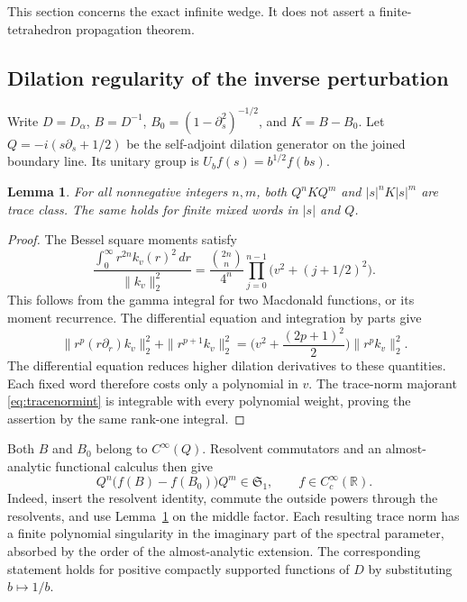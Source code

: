 \documentclass[11pt]{amsart}
\numberwithin{equation}{section}
\newtheorem{lemma}[theorem]{Lemma}
\theoremstyle{remark}
\newcommand{\R}{\mathbb{R}}
\newcommand{\Sone}{\mathfrak{S}_1}
\begin{document}
This section concerns the exact infinite wedge. It does not assert a finite-tetrahedron propagation theorem.

\subsection{Dilation regularity of the inverse perturbation}
Write $D=D_\alpha$, $B=D^{-1}$, $B_0=(1-\partial_s^2)^{-1/2}$, and $K=B-B_0$. Let $Q=-i(s\partial_s+1/2)$ be the self-adjoint dilation generator on the joined boundary line. Its unitary group is $U_bf(s)=b^{1/2}f(bs)$.

\begin{lemma}\label{lem:dilation}
For all nonnegative integers $n,m$, both $Q^nKQ^m$ and $|s|^nK|s|^m$ are trace class. The same holds for finite mixed words in $|s|$ and $Q$.
\end{lemma}

\begin{proof}
The Bessel square moments satisfy
\begin{equation}\label{eq:besselmoments}
\frac{\int_0^\infty r^{2n}k_v(r)^2\,dr}{\|k_v\|_2^2}=\frac{\binom{2n}{n}}{4^n}\prod_{j=0}^{n-1}\big(v^2+(j+1/2)^2\big) .
\end{equation}
This follows from the gamma integral for two Macdonald functions, or its moment recurrence. The differential equation and integration by parts give
\begin{equation}\label{eq:besselibp}
\|r^p(r\partial_r)k_v\|_2^2+\|r^{p+1}k_v\|_2^2=\Big(v^2+\frac{(2p+1)^2}{2}\Big)\|r^pk_v\|_2^2 .
\end{equation}
The differential equation reduces higher dilation derivatives to these quantities. Each fixed word therefore costs only a polynomial in $v$. The trace-norm majorant \eqref{eq:tracenormint} is integrable with every polynomial weight, proving the assertion by the same rank-one integral.
\end{proof}

Both $B$ and $B_0$ belong to $C^\infty(Q)$. Resolvent commutators and an almost-analytic functional calculus then give
\begin{equation}\label{eq:Cinfty}
Q^n\big(f(B)-f(B_0)\big)Q^m\in\Sone,\qquad f\in C_c^\infty(\R) .
\end{equation}
Indeed, insert the resolvent identity, commute the outside powers through the resolvents, and use Lemma~\ref{lem:dilation} on the middle factor. Each resulting trace norm has a finite polynomial singularity in the imaginary part of the spectral parameter, absorbed by the order of the almost-analytic extension. The corresponding statement holds for positive compactly supported functions of $D$ by substituting $b\mapsto1/b$.
\end{document}
